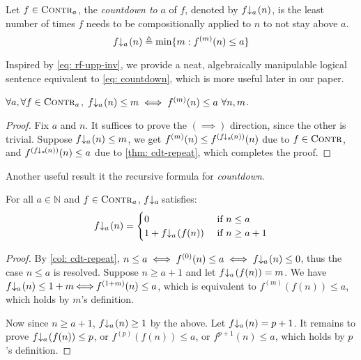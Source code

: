 \begin{defn} \label{defn: informal-countdown}
Let $f\in \text{\scshape{Contr}}_a$, the \textit{countdown to} $a$ of $f$, denoted by $\cdt{f}{a}(n)$, is the least number of times $f$ needs to be compositionally applied to $n$ to not stay above $a$.
\begin{equation} \label{eq: countdown}
\cdt{f}{a}( n ) \triangleq \min\{m: f^{(m)}(n)\le a \}
\end{equation}
\end{defn}

Inspired by \eqref{eq: rf-upp-inv}, we provide a neat, algebraically manipulable logical sentence equivalent to \eqref{eq: countdown}, which is more useful later in our paper.
\begin{col} \label{col: cdt-repeat}
	$\forall a, \forall f\in \text{\scshape{Contr}}_{a}$, $\cdt{f}{a}(n)\le m \iff f^{(m)}(n)\le a \ \forall n, m$.
\end{col}
\begin{proof}
	Fix $a$ and $n$. It suffices to prove the $(\!\!\implies\!\!)$ direction, since the other is trivial. Suppose $\cdt{f}{a}(n)\le m$, we get $f^{(m)}(n)\le f^{(\cdt{f}{a}(n))}(n)$ due to $f\in \text{\scshape{Contr}}$, and $f^{(\cdt{f}{a}(n))}(n)\le a$ due to \cref{thm: cdt-repeat}, which completes the proof.
\end{proof}
Another useful result it the recursive formula for \emph{countdown}.
\begin{thm} \label{thm: cdt-recursion}
	For all $a\in \mathbb{N}$ and $f\in \text{\scshape{Contr}}_{a}$, $\cdt{f}{a}$ satisfies:
	\begin{equation*}
	\cdt{f}{a}(n) = \begin{cases}
	0 & \text{ if } n \le a \\ 1 + \cdt{f}{a}(f(n)) & \text{ if } n \ge a + 1
	\end{cases}
	\end{equation*}
\end{thm}
\begin{proof}
By \cref{col: cdt-repeat}, $n\le a \iff f^{(0)}(n)\le a \iff \cdt{f}{a}(n)\le 0$, thus the case $n\le a$ is resolved. Suppose $n\ge a+1$ and let $\cdt{f}{a}(f(n)) = m$. We have $\cdt{f}{a}(n)\le 1+m \!\! \iff \!\! f^{(1+m)}(n) \le a$, which is equivalent to $f^{(m)}(f(n)) \le a$, which holds by $m$'s definition.

Now since $n\ge a+1$, $\cdt{f}{a}(n)\ge 1$ by the above. Let $\cdt{f}{a}(n) = p+1$. It remains to prove $\cdt{f}{a}(f(n))\le p$, or $f^{(p)}(f(n))\le a$, or $f^{p+1}(n)\le a$, which holds by $p$'s definition.
\end{proof}

